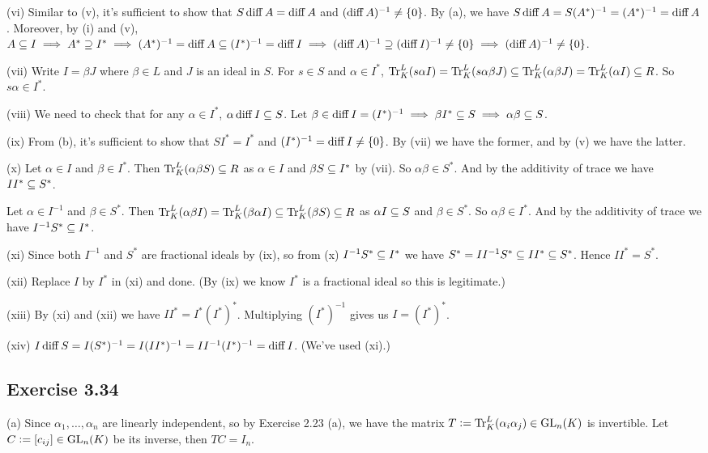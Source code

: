 \documentclass[../Marcus.tex]{subfiles}
\begin{document}
(vi) Similar to (v), it's sufficient to show that $S\operatorname{diff} A = \operatorname{diff} A$ and $(\operatorname{diff} A)^{-1} \neq \{0\}$. By (a), we have $S \operatorname{diff} A = S (A^*)^{-1} = (A^*)^{-1} = \operatorname{diff} A$. Moreover, by (i) and (v), $A \subseteq I \implies A^* \supseteq I^* \implies (A^*)^{-1} = \operatorname{diff} A \subseteq (I^*)^{-1} = \operatorname{diff} I \implies (\operatorname{diff} A)^{-1} \supseteq (\operatorname{diff} I)^{-1} \neq \{0\} \implies (\operatorname{diff} A)^{-1} \neq \{0\}$.

(vii) Write $I=\beta J$ where $\beta \in L$ and $J$ is an ideal in $S$. For $s\in S$ and $\alpha \in I^*$, $\operatorname{Tr}^L_K(s\alpha I) = \operatorname{Tr}^L_K(s\alpha \beta J) \subseteq \operatorname{Tr}^L_K(\alpha\beta J) = \operatorname{Tr}^L_K(\alpha I) \subseteq R$. So $s\alpha \in I^*$.

(viii) We need to check that for any $\alpha \in I^*$, $\alpha \operatorname{diff} I \subseteq S$. Let $\beta \in\operatorname{diff} I = (I^*)^{-1} \implies \beta I^* \subseteq S \implies \alpha\beta \subseteq S$.

(ix) From (b), it's sufficient to show that $SI^* = I^*$ and $(I^*)^{-1} = \operatorname{diff} I \neq \{0\}$. By (vii) we have the former, and by (v) we have the latter.

(x) Let $\alpha \in I$ and $\beta \in I^*$. Then $\operatorname{Tr}^L_K(\alpha\beta S) \subseteq R$ as $\alpha \in I$ and $\beta S \subseteq I^*$ by (vii). So $\alpha\beta \in S^*$. And by the additivity of trace we have $II^* \subseteq S^*$.

Let $\alpha \in I^{-1}$ and $\beta \in S^*$. Then $\operatorname{Tr}^L_K(\alpha\beta I)  = \operatorname{Tr}^L_K(\beta\alpha I) \subseteq \operatorname{Tr}^L_K(\beta S) \subseteq R$ as $\alpha I \subseteq S$ and $\beta \in S^*$. So $\alpha\beta \in I^*$. And by the additivity of trace we have $I^{-1}S^* \subseteq I^*$.

(xi) Since both $I^{-1}$ and $S^*$ are fractional ideals by (ix), so from (x) $I^{-1}S^* \subseteq I^*$ we have $S^* = II^{-1}S^* \subseteq II^* \subseteq S^*$. Hence $II^*=S^*$.

(xii) Replace $I$ by $I^*$ in (xi) and done. (By (ix) we know $I^*$ is a fractional ideal so this is legitimate.)

(xiii) By (xi) and (xii) we have $II^* = I^*(I^*)^*$. Multiplying $(I^*)^{-1}$ gives us $I=(I^*)^*$.

(xiv) $I \operatorname{diff} S = I(S^*)^{-1} = I(II^*)^{-1} = II^{-1}(I^*)^{-1} = \operatorname{diff} I$. (We've used (xi).)

\subsection*{Exercise 3.34}

(a) Since $\alpha_1,\ldots,\alpha_n$ are linearly independent, so by Exercise 2.23 (a), we have the matrix $T := \operatorname{Tr}^L_K(\alpha_i\alpha_j) \in \operatorname{GL}_n(K)$ is invertible. Let $C:=[c_{ij}] \in \operatorname{GL}_n(K)$ be its inverse, then $TC=I_n$.
\end{document}
